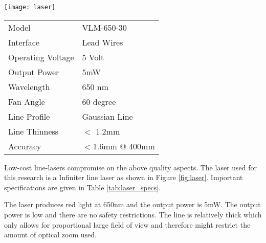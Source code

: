 {\centering \vspace*{\baselineskip}
\begin{minipage}{0.49\textwidth}
   \centering
   \texttt{[image: laser]} 
   \label{fig:laser}
\end{minipage}
\begin{minipage}{0.49\textwidth}
   \centering
\begin{tabular}{ll} \hline \hline
Model & VLM-650-30  \\
Interface & Lead Wires \\
Operating Voltage & 5 Volt \\
Output Power & 5mW \\
Wavelength & 650 nm \\
Fan Angle & 60 degree \\
Line Profile & Gaussian Line \\
Line Thinness & $<$ 1.2mm \\
Accuracy & $<$1.6mm @ 400mm \\ \hline
\end{tabular}
\label{tab:laser_specs}
\end{minipage}
}

\skippar
Low-cost line-lasers compromise on the above quality aspects. The laser used for this research is a Infiniter line laser as shown in Figure \ref{fig:laser}. Important specifications are given in Table \ref{tab:laser_specs}. 

The laser produces red light at 650nm and the output power is 5mW. The output power is low and there are no safety restrictions. The line is relatively thick which only allows for proportional large field of view and therefore might restrict the amount of optical zoom used. 

